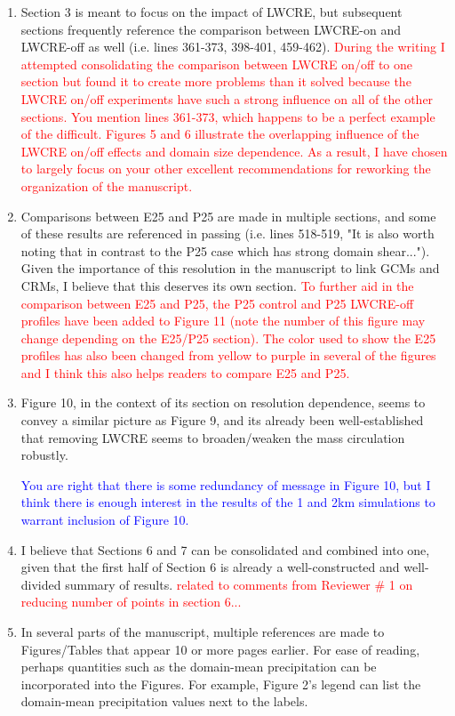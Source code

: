\documentclass[draft]{agujournal2019}
\begin{document}
\begin{enumerate}
  \item Section 3 is meant to focus on the impact of LWCRE, but subsequent sections frequently reference the comparison between LWCRE-on and LWCRE-off as well (i.e. lines 361-373, 398-401, 459-462).
  \textcolor{red}{During the writing I attempted consolidating the comparison between LWCRE on/off to one section but found it to create more problems than it 
  solved because the LWCRE on/off experiments have such a strong influence on all of the other sections.  You mention lines 361-373, which happens to be a 
  perfect example of the difficult.  Figures 5 and 6 illustrate the overlapping influence of the LWCRE on/off effects and domain size dependence.  
  As a result, I have chosen to largely focus on your other excellent recommendations for reworking the organization of the manuscript.}
  \item Comparisons between E25 and P25 are made in multiple sections, and some of these results are referenced in passing (i.e. lines 518-519, "It is also worth noting that in contrast to the P25 case which has strong domain shear..."). Given the importance of this resolution in the manuscript to link GCMs and CRMs, I believe that this deserves its own section.
  \textcolor{red}{To further aid in the comparison between E25 and P25, the P25 control and P25 LWCRE-off profiles have been added to Figure 11 (note the number of this figure may change depending on the E25/P25 section).  The color used to show the E25 profiles has also been changed from yellow to purple in several of the figures and I think this also helps readers to compare E25 and P25.}
  \item Figure 10, in the context of its section on resolution dependence, seems to convey a similar picture as Figure 9, and its already been well-established that removing LWCRE seems to broaden/weaken the mass circulation robustly.  
  
  \textcolor{blue}{You are right that there is some redundancy of message in Figure 10, but I think there is enough interest in the results of the 1 and 2km simulations to warrant inclusion of Figure 10. }
  
  \item I believe that Sections 6 and 7 can be consolidated and combined into one, given that the first half of Section 6 is already a well-constructed and well-divided summary of results.
  \textcolor{red}{related to comments from Reviewer \# 1 on reducing number of points in section 6...}
  \item In several parts of the manuscript, multiple references are made to Figures/Tables that appear 10 or more pages earlier. For ease of reading, perhaps quantities such as the domain-mean precipitation can be incorporated into the Figures. For example, Figure 2's legend can list the domain-mean precipitation values next to the labels.
\end{enumerate}
\end{document}
